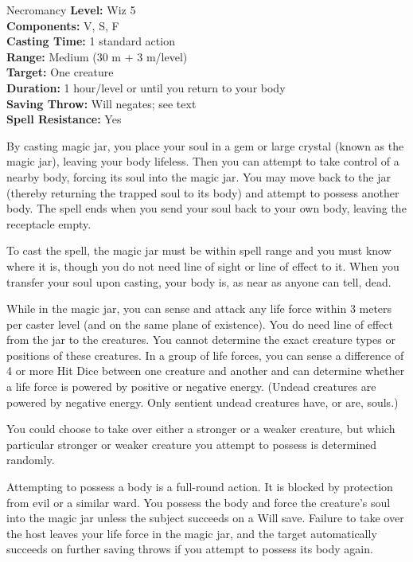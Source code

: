 {Necromancy}
{
	\textbf{Level:}
	Wiz 5\\
	\textbf{Components:}
	V, S, F\\
	\textbf{Casting Time:}
	1 standard action\\
	\textbf{Range:}
	Medium (30 m + 3 m/level)\\
	\textbf{Target:}
	One creature\\
	\textbf{Duration:}
	1 hour/level or until you return to your body\\
	\textbf{Saving Throw:}
	Will negates; see text\\
	\textbf{Spell Resistance:}
	Yes\\
}
{
	By casting magic jar, you place your soul in a gem or large crystal (known as the magic jar), leaving your body lifeless. Then you can attempt to take control of a nearby body, forcing its soul into the magic jar. You may move back to the jar (thereby returning the trapped soul to its body) and attempt to possess another body. The spell ends when you send your soul back to your own body, leaving the receptacle empty.

	To cast the spell, the magic jar must be within spell range and you must know where it is, though you do not need line of sight or line of effect to it. When you transfer your soul upon casting, your body is, as near as anyone can tell, dead.

	While in the magic jar, you can sense and attack any life force within 3 meters per caster level (and on the same plane of existence). You do need line of effect from the jar to the creatures. You cannot determine the exact creature types or positions of these creatures. In a group of life forces, you can sense a difference of 4 or more Hit Dice between one creature and another and can determine whether a life force is powered by positive or negative energy. (Undead creatures are powered by negative energy. Only sentient undead creatures have, or are, souls.)

	You could choose to take over either a stronger or a weaker creature, but which particular stronger or weaker creature you attempt to possess is determined randomly.

	Attempting to possess a body is a full-round action. It is blocked by protection from evil or a similar ward. You possess the body and force the creature's soul into the magic jar unless the subject succeeds on a Will save. Failure to take over the host leaves your life force in the magic jar, and the target automatically succeeds on further saving throws if you attempt to possess its body again.

}
